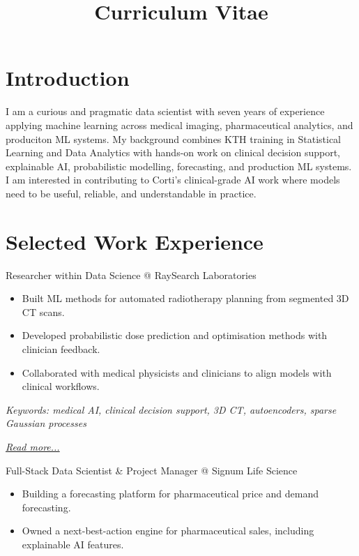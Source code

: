 \documentclass[11pt,a4paper]{moderncv}
\title{Curriculum Vitae}
\begin{document}
\makecvtitle

\section*{Introduction}
I am a curious and pragmatic data scientist with seven years of experience applying machine learning across medical imaging, pharmaceutical analytics, and produciton ML systems. My background combines KTH training in Statistical Learning and Data Analytics with hands-on work on clinical decision support, explainable AI, probabilistic modelling, forecasting, and production ML systems. I am interested in contributing to Corti's clinical-grade AI work where models need to be useful, reliable, and understandable in practice.

\section{Selected Work Experience}

\large{Researcher within Data Science @ RaySearch Laboratories}
\normalsize
\begin{itemize}
    \item Built ML methods for automated radiotherapy planning from segmented 3D CT scans.
    \item Developed probabilistic dose prediction and optimisation methods with clinician feedback.
    \item Collaborated with medical physicists and clinicians to align models with clinical workflows.
\end{itemize}

{\footnotesize\textit{Keywords: medical AI, clinical decision support, 3D CT, autoencoders, sparse Gaussian processes}}

\hfill{\small{\textit{\hyperref[sec:raysearch]{Read more...}}}}

\large{Full-Stack Data Scientist \& Project Manager @ Signum Life Science}
\normalsize
\begin{itemize}
    \item Building a forecasting platform for pharmaceutical price and demand forecasting.
    \item Owned a next-best-action engine for pharmaceutical sales, including explainable AI features.
\end{itemize}
\end{document}
